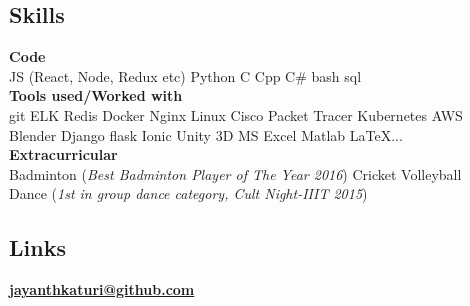 \documentclass[letterpaper]{deedy-resume} %
\begin{document}

\lastupdated %



\begin{minipage}[t]{0.31\textwidth} %

\vspace{\topsep} %
\vspace{\topsep} %
\subsection{Skills}
\textbf{Code} \\
JS (React, Node, Redux etc) \textbullet{} Python \textbullet{} C \textbullet{} Cpp \textbullet{} C\# \textbullet{} bash \textbullet{} sql \\
\textbf{Tools used/Worked with} \\
git \textbullet{} ELK \textbullet{} Redis \textbullet{} Docker
\textbullet{} Nginx \textbullet{} Linux \textbullet{} Cisco Packet Tracer
\textbullet{} Kubernetes \textbullet{} AWS \textbullet{} Blender 
\textbullet{} Django \textbullet{} flask \textbullet{} Ionic \textbullet{} Unity 3D
\textbullet{} MS Excel \textbullet{} Matlab \textbullet{} \LaTeX ... \\
\textbf{Extracurricular} \\
\textbullet{} Badminton (\textit{Best Badminton Player of The Year 2016}) \textbullet{}
Cricket \textbullet{} Volleyball \\
\textbullet{} Dance (\textit{1st in group dance category, Cult Night-IIIT 2015}) \\
\sectionspace

\subsection{Links} 
\href{https://github.com/jayanthkaturi}{\bf jayanthkaturi@github.com} \\
\sectionspace %


\end{minipage}
\end{document}

